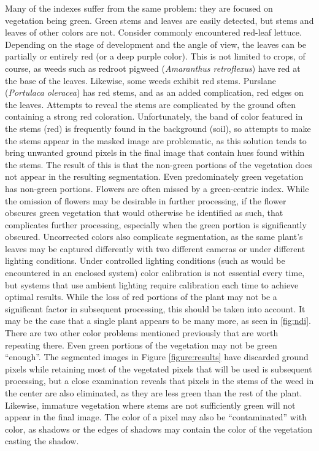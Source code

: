 \documentclass[letterpaper]{report}
\begin{document}
{\label{section:problems-color}
Many of the indexes suffer from the same problem: they are focused on vegetation being green. Green stems and leaves are easily detected, but stems and leaves of other colors are not. Consider commonly encountered red-leaf lettuce. Depending on the stage of development and the angle of view, the leaves can be partially or entirely red (or a deep purple color). This is not limited to crops, of course, as weeds such as redroot pigweed (\textit{Amaranthus retroflexus}) have red at the base of the leaves. Likewise, some weeds exhibit red stems. Purslane (\textit{Portulaca oleracea}) has red stems, and as an added complication, red edges on the leaves. Attempts to reveal the stems are complicated by the ground often containing a strong red coloration. Unfortunately, the band of color featured in the stems (red) is frequently found in the background (soil), so attempts to make the stems appear in the masked image are problematic, as this solution tends to bring unwanted ground pixels in the final image that contain hues found within the stems. The result of this is that the non-green portions of the vegetation does not appear in the resulting segmentation.  Even predominately green vegetation has non-green portions. Flowers are often missed by a green-centric index. While the omission of flowers may be desirable in further processing, if the flower obscures green vegetation that would otherwise be identified as such, that complicates further processing, especially when the green portion is significantly obscured. Uncorrected colors also complicate segmentation, as the same plant's leaves may be captured differently with two different cameras or under different lighting conditions. Under controlled lighting conditions (such as would be encountered in an enclosed system) color calibration is not essential every time, but systems that use ambient lighting require calibration each time to achieve optimal results. While the loss of red portions of the plant may not be a significant factor in subsequent processing, this should be taken into account. It may be the case that a single plant appears to be many more, as seen in \ref{fig:ndi}.
There are two other color problems mentioned previously that are worth repeating there. Even green portions of the vegetation may not be green ``enough''. The segmented images in Figure \ref{figure:results} have discarded ground pixels while retaining most of the vegetated pixels that will be used is subsequent processing, but a close examination reveals that pixels in the stems of the weed in the center are also eliminated, as they are less green than the rest of the plant. Likewise, immature vegetation where stems are not sufficiently green will not appear in the final image. The color of a pixel may also be ``contaminated'' with color, as shadows or the edges of shadows may contain the color of the vegetation casting the shadow.
}
\end{document}
